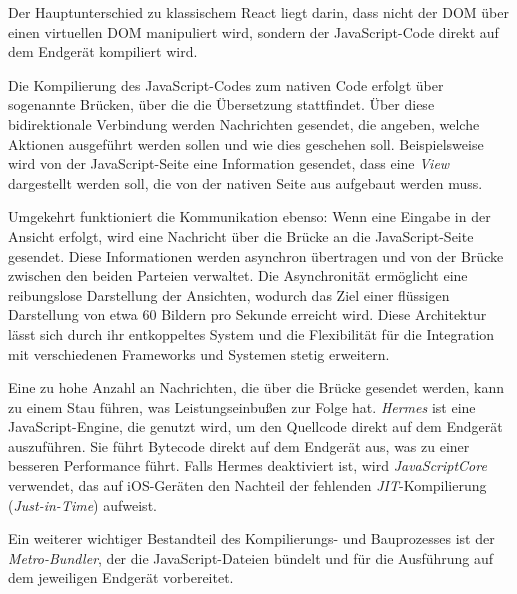 \documentclass[a4paper,12pt]{article}
\begin{document}
Der Hauptunterschied zu klassischem React liegt darin, dass nicht der DOM über einen virtuellen DOM manipuliert wird, sondern der JavaScript-Code direkt auf dem Endgerät kompiliert wird.

\vspace{0.5cm}

Die Kompilierung des JavaScript-Codes zum nativen Code erfolgt über sogenannte Brücken, über die die Übersetzung stattfindet. Über diese bidirektionale Verbindung werden Nachrichten gesendet, die angeben, welche Aktionen ausgeführt werden sollen und wie dies geschehen soll. Beispielsweise wird von der JavaScript-Seite eine Information gesendet, dass eine \textit{View} dargestellt werden soll, die von der nativen Seite aus aufgebaut werden muss. 

\vspace{0.5cm}

Umgekehrt funktioniert die Kommunikation ebenso: Wenn eine Eingabe in der Ansicht erfolgt, wird eine Nachricht über die Brücke an die JavaScript-Seite gesendet. Diese Informationen werden asynchron übertragen und von der Brücke zwischen den beiden Parteien verwaltet. Die Asynchronität ermöglicht eine reibungslose Darstellung der Ansichten, wodurch das Ziel einer flüssigen Darstellung von etwa 60 Bildern pro Sekunde erreicht wird. Diese Architektur lässt sich durch ihr entkoppeltes System und die Flexibilität für die Integration mit verschiedenen Frameworks und Systemen stetig erweitern.

\vspace{0.5cm}

Eine zu hohe Anzahl an Nachrichten, die über die Brücke gesendet werden, kann zu einem Stau führen, was Leistungseinbußen zur Folge hat. \textit{Hermes} ist eine JavaScript-Engine, die genutzt wird, um den Quellcode direkt auf dem Endgerät auszuführen. Sie führt Bytecode direkt auf dem Endgerät aus, was zu einer besseren Performance führt. Falls Hermes deaktiviert ist, wird \textit{JavaScriptCore} verwendet, das auf iOS-Geräten den Nachteil der fehlenden \textit{JIT}-Kompilierung (\textit{Just-in-Time}) aufweist. 

\vspace{0.5cm}

Ein weiterer wichtiger Bestandteil des Kompilierungs- und Bauprozesses ist der \textit{Metro-Bundler}, der die JavaScript-Dateien bündelt und für die Ausführung auf dem jeweiligen Endgerät vorbereitet.

\vspace{0.5cm}
\end{document}
